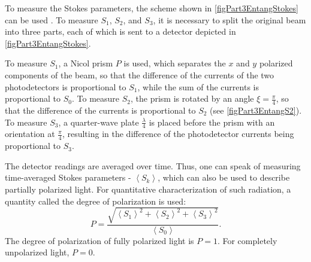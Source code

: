

To measure the Stokes parameters, the scheme
shown in \autoref{figPart3EntangStokes} can be used
\cite{bEntangKlyshko}. To measure $S_1$, $S_2$, and $S_3$, it is necessary
to split the original beam into three parts, each of which is sent to
a detector depicted in \autoref{figPart3EntangStokes}.



To measure $S_1$, a Nicol prism $P$ is used, which separates 
the $x$ and $y$ polarized components of the beam,
so that the difference of the currents of the two photodetectors is proportional to $S_1$, while
the sum of the currents is proportional to $S_0$. 
To measure $S_2$, the prism is rotated by an angle $\xi =
\frac{\pi}{4}$, so that the difference of the currents is proportional to $S_2$
(see \autoref{figPart3EntangS2}). 
To measure $S_3$, a quarter-wave plate
$\frac{\lambda}{4}$ is placed before the prism with an orientation at $\frac{\pi}{4}$, resulting
in the difference of the photodetector currents being proportional to $S_3$.

The detector readings are averaged over time. Thus, one can
speak of measuring time-averaged Stokes parameters - 
$\left<S_k\right>$, which can also be used to describe
partially polarized light. For quantitative characterization
of such radiation, a quantity called
the degree of polarization is used:
\begin{equation}
P = \frac{\sqrt{\left<S_1\right>^2 + \left<S_2\right>^2 +
    \left<S_3\right>^2}}{\left<S_0\right>}.
\label{eqEntangPolyarDegree}
\nonumber
\end{equation}
The degree of polarization of fully polarized light is $P = 1$. For completely
unpolarized light, $P = 0$.

